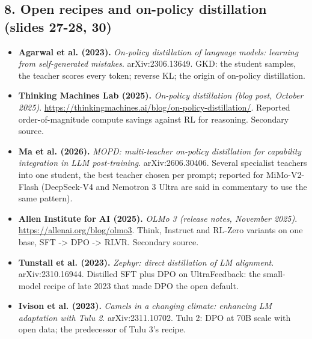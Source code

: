 \documentclass[11pt,letterpaper]{article}
\begin{document}
\subsection*{8. Open recipes and on-policy distillation (slides 27-28, 30)}
\begin{itemize}[leftmargin=1.2em,itemsep=3pt]\sloppy
\item \textbf{Agarwal et al. (2023).} \textit{On-policy distillation of language models: learning from self-generated mistakes}. arXiv:2306.13649. GKD: the student samples, the teacher scores every token; reverse KL; the origin of on-policy distillation.
\item \textbf{Thinking Machines Lab (2025).} \textit{On-policy distillation (blog post, October 2025)}. \url{https://thinkingmachines.ai/blog/on-policy-distillation/}. Reported order-of-magnitude compute savings against RL for reasoning. Secondary source.
\item \textbf{Ma et al. (2026).} \textit{MOPD: multi-teacher on-policy distillation for capability integration in LLM post-training}. arXiv:2606.30406. Several specialist teachers into one student, the best teacher chosen per prompt; reported for MiMo-V2-Flash (DeepSeek-V4 and Nemotron 3 Ultra are said in commentary to use the same pattern).
\item \textbf{Allen Institute for AI (2025).} \textit{OLMo 3 (release notes, November 2025)}. \url{https://allenai.org/blog/olmo3}. Think, Instruct and RL-Zero variants on one base, SFT -> DPO -> RLVR. Secondary source.
\item \textbf{Tunstall et al. (2023).} \textit{Zephyr: direct distillation of LM alignment}. arXiv:2310.16944. Distilled SFT plus DPO on UltraFeedback: the small-model recipe of late 2023 that made DPO the open default.
\item \textbf{Ivison et al. (2023).} \textit{Camels in a changing climate: enhancing LM adaptation with Tulu 2}. arXiv:2311.10702. Tulu 2: DPO at 70B scale with open data; the predecessor of Tulu 3's recipe.
\end{itemize}
\end{document}
